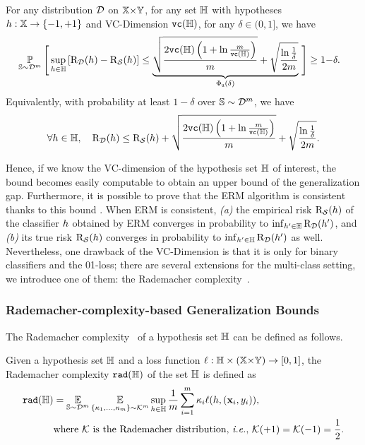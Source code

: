 \begin{theorem}\label{chap:intro:theorem:vc-dim} For any distribution $\mathcal{D}$ on $\mathbb{X}{\times}\mathbb{Y}$, for any set $\mathbb{H}$ with hypotheses $h:\mathbb{X}\to\{-1, +1\}$ and VC-Dimension ${\tt vc}(\mathbb{H})$, for any $\delta\in(0,1]$, we have 
\begin{align*}
    &\operatorname*{\mathbb{P}}_{\mathbb{S}\sim\mathcal{D}^{m}}\Bigg[\sup_{h\in\mathbb{H}}\left[\text{R}_{\mathcal{D}}(h)-\text{R}_{\mathcal{S}}(h)\right] \le  \underbrace{\sqrt{\frac{2{\tt vc}(\mathbb{H})\left(1+\ln\frac{m}{{\tt vc}(\mathbb{H})}\right)}{m}} + \sqrt{\frac{\ln\frac{1}{\delta}}{2m}}}_{\Phi_{{\tt u}}(\delta)}\,\Bigg] \ge 1{-}\delta.
\end{align*}
Equivalently, with probability at least $1{-}\delta$ over $\mathbb{S}\sim\mathcal{D}^m$, we have
\begin{align*}
    \forall h\in\mathbb{H},\quad \text{R}_{\mathcal{D}}(h) \le \text{R}_{\mathcal{S}}(h)+ \sqrt{\frac{2{\tt vc}(\mathbb{H})\left(1+\ln\frac{m}{{\tt vc}(\mathbb{H})}\right)}{m}} + \sqrt{\frac{\ln\frac{1}{\delta}}{2m}}.
\end{align*}
\end{theorem}

Hence, if we know the VC-dimension of the hypothesis set $\mathbb{H}$ of interest, the bound becomes easily computable to obtain an upper bound of the generalization gap.  
Furthermore, it is possible to prove that the ERM algorithm is consistent~\citep{Vapnik1998} thanks to this bound \citep[see Proposition 4.1][]{MohriRostamizadehTalwalkar2012}.
When ERM is consistent, {\it (a)} the empirical risk $\text{R}_{\mathcal{S}}(h)$ of the classifier $h$ obtained by ERM converges in probability to $\inf_{h'\in\mathbb{H}}\text{R}_{\mathcal{D}}(h')$, and {\it (b)} its true risk $\text{R}_{\mathcal{S}}(h)$ converges in probability to $\inf_{h'\in\mathbb{H}}\text{R}_{\mathcal{D}}(h')$ as well.
Nevertheless, one drawback of the VC-Dimension is that it is only for binary classifiers and the 01-loss;
there are several extensions for the multi-class setting, we introduce one of them: the Rademacher complexity~\citep{BartlettMendelson2002}.

\subsubsection{Rademacher-complexity-based Generalization Bounds}

The Rademacher complexity~\citep{BartlettMendelson2002} of a hypothesis set $\mathbb{H}$ can be defined as follows.

\begin{definition}\label{chap:intro:def:rademacher}
Given a hypothesis set $\mathbb{H}$ and a loss function $\ell: \mathbb{H}\times(\mathbb{X}{\times}\mathbb{Y}) \to [0, 1]$, the Rademacher complexity ${\tt rad}(\mathbb{H})$ of the set $\mathbb{H}$ is defined as 
\begin{align*}
    {\tt rad}(\mathbb{H}) &= \operatorname*{\mathbb{E}}_{\mathbb{S}\sim\mathcal{D}^m}\operatorname*{\mathbb{E}}_{\{\kappa_1,\dots, \kappa_m\}\sim\mathcal{K}^m}\sup_{h\in\mathbb{H}} \frac{1}{m}\sum_{i=1}^{m}\kappa_i\ell(h, (\mathbf{x}_i, y_i)),\\
    &\text{where $\mathcal{K}$ is the Rademacher distribution, {\it i.e.}, }\mathcal{K}(+1) = \mathcal{K}(-1) = \frac{1}{2}.
\end{align*}
\end{definition}

